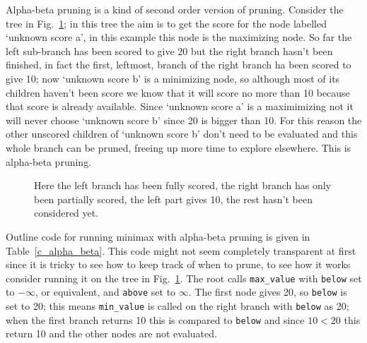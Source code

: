 \documentclass[11pt,a4paper]{scrartcl}
\begin{document}
Alpha-beta pruning is a kind of second order version of
pruning. Consider the tree in Fig.~\ref{fig:partial}; in this tree the
aim is to get the score for the node labelled \lq{}unknown score
a\rq{}, in this example this node is the maximizing node. So far the
left sub-branch has been scored to give 20 but the right branch hasn't
been finished, in fact the first, leftmost, branch of the right branch
ha been scored to give 10; now \lq{}unknown score b\rq{} is a
minimizing node, so although most of its children haven't been score
we know that it will score no more than 10 because that score is
already available. Since \lq{}unknown score a\rq{} is a maximimizing
not it will never choose \lq{}unknown score b\rq{} since 20 is bigger
than 10. For this reason the other unscored children of \lq{}unknown
score b\rq{} don't need to be evaluated and this whole branch can be
pruned, freeing up more time to explore elsewhere. This is alpha-beta
pruning.

\begin{figure}
\begin{center}
\end{center}
\caption{Here the left branch has been fully scored, the right branch has only been partially scored, the left part gives 10, the rest hasn't been considered yet.\label{fig:partial}}
\end{figure}

Outline code for running minimax with alpha-beta pruning is given in
Table~\ref{c_alpha_beta}. This code might not seem completely
transparent at first since it is tricky to see how to keep track of
when to prune, to see how it works consider running it on the tree in
Fig.~\ref{fig:partial}. The root calls \texttt{max\_value} with
\texttt{below} set to $-\infty$, or equivalent, and \texttt{above} set
to $\infty$. The first node gives 20, so \texttt{below} is set to 20;
this means \texttt{min\_value} is called on the right branch with
\texttt{below} as 20; when the first branch returns 10 this is
compared to \texttt{below} and since $10<20$ this return 10 and the
other nodes are not evaluated.
\end{document}
